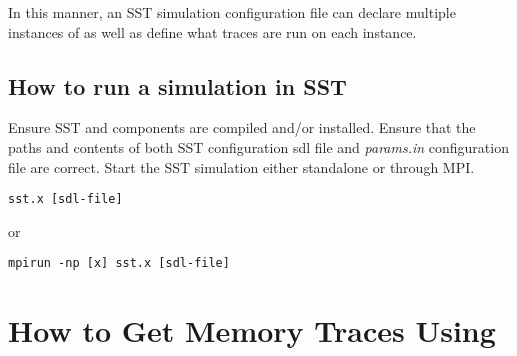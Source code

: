 In this manner, an SST simulation configuration file can declare multiple 
instances of \SIM as well as define what traces are run on each \SIM instance.

\subsection{How to run a \SIM simulation in SST}

Ensure SST and \SIM components are compiled and/or installed.  
Ensure that the paths and contents of both SST configuration sdl file and
\SIM \textit{params.in} configuration file are correct. Start the SST simulation 
either standalone or through MPI.

\begin{Verbatim}
sst.x [sdl-file]
\end{Verbatim}
or
\begin{Verbatim}
mpirun -np [x] sst.x [sdl-file]
\end{Verbatim}



\section{How to Get Memory Traces Using \SIM}












